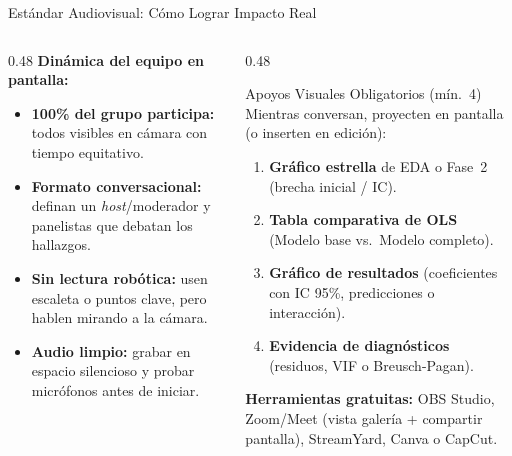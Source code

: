 \documentclass[aspectratio=169, 10pt]{beamer}
\begin{document}
\begin{frame}{Est\'andar Audiovisual: C\'omo Lograr Impacto Real}
  \begin{columns}[T]
    \begin{column}{0.48\textwidth}
      \textbf{Din\'amica del equipo en pantalla:}
      \small
      \begin{itemize}\setlength{\itemsep}{4pt}
        \item \textbf{100\% del grupo participa:} todos visibles en c\'amara con tiempo equitativo.
        \item \textbf{Formato conversacional:} definan un \textit{host}/moderador y panelistas que debatan los hallazgos.
        \item \textbf{Sin lectura rob\'otica:} usen escaleta o puntos clave, pero hablen mirando a la c\'amara.
        \item \textbf{Audio limpio:} grabar en espacio silencioso y probar micr\'ofonos antes de iniciar.
      \end{itemize}
    \end{column}
    \begin{column}{0.48\textwidth}
      \begin{exampleblock}{Apoyos Visuales Obligatorios (m\'in.\ 4)}
        \footnotesize Mientras conversan, proyecten en pantalla (o inserten en edici\'on):
        \begin{enumerate}\setlength{\itemsep}{2.5pt}
          \footnotesize
          \item \textbf{Gr\'afico estrella} de EDA o Fase~2 (brecha inicial / IC).
          \item \textbf{Tabla comparativa de OLS} (Modelo base vs.\ Modelo completo).
          \item \textbf{Gr\'afico de resultados} (coeficientes con IC 95\%, predicciones o interacci\'on).
          \item \textbf{Evidencia de diagn\'osticos} (residuos, VIF o Breusch-Pagan).
        \end{enumerate}
      \end{exampleblock}
      \vspace{3pt}
      {\footnotesize \textbf{Herramientas gratuitas:} OBS Studio, Zoom/Meet (vista galer\'ia + compartir pantalla), StreamYard, Canva o CapCut.}
    \end{column}
  \end{columns}
\end{frame}
\end{document}

